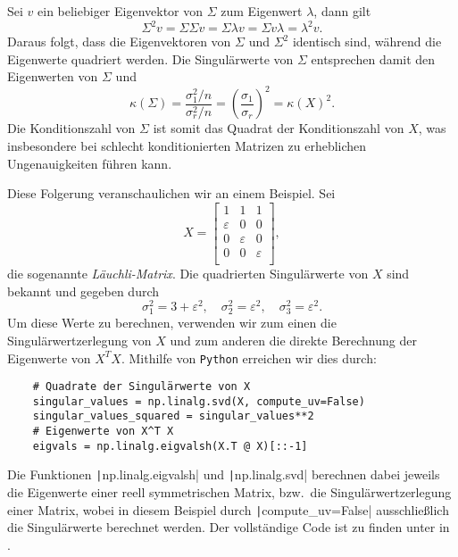 Sei \(v\) ein beliebiger Eigenvektor von \(\Sigma\) zum Eigenwert \(\lambda\), dann gilt
\begin{equation*}
    \Sigma^{2}v = \Sigma \Sigma v = \Sigma \lambda v = \Sigma v \lambda = \lambda^{2} v.
\end{equation*}   
Daraus folgt, dass die Eigenvektoren von \(\Sigma\) und \(\Sigma^{2}\) identisch sind, während die Eigenwerte quadriert werden.
Die Singulärwerte von \(\Sigma\) entsprechen damit den Eigenwerten von \(\Sigma\) und
\begin{equation*}
    \kappa(\Sigma) = \frac{\sigma_{1}^{2}/n}{\sigma_{r}^{2}/n}={\left(\frac{\sigma_{1}}{\sigma_{r}}\right)}^{2} = {\kappa(X)}^{2}.
\end{equation*}  
Die Konditionszahl von \(\Sigma\) ist somit das Quadrat der Konditionszahl von \(X\), was insbesondere bei schlecht konditionierten Matrizen zu erheblichen Ungenauigkeiten führen kann.

Diese Folgerung veranschaulichen wir an einem Beispiel.
Sei 
\begin{equation*}
    X = 
    \begin{bmatrix}
        1 & 1 & 1 \\
        \varepsilon & 0 & 0 \\
        0 & \varepsilon & 0 \\
        0 & 0 & \varepsilon \\
    \end{bmatrix},
\end{equation*}
die sogenannte \emph{Läuchli-Matrix}.
Die quadrierten Singulärwerte von \(X\) sind bekannt und gegeben durch  
\begin{equation*}
    \sigma_{1}^{2} = 3 + \varepsilon^{2}, \quad \sigma_{2}^{2} = \varepsilon^{2}, \quad \sigma_{3}^{2} = \varepsilon^{2}.
\end{equation*} 
Um diese Werte zu berechnen, verwenden wir zum einen die Singulärwertzerlegung von \(X\) und zum anderen die direkte Berechnung der Eigenwerte von \(X^{T}X\).   
Mithilfe von \texttt{Python} erreichen wir dies durch:
\begin{verbatim}
    # Quadrate der Singulärwerte von X
    singular_values = np.linalg.svd(X, compute_uv=False)
    singular_values_squared = singular_values**2   
    # Eigenwerte von X^T X
    eigvals = np.linalg.eigvalsh(X.T @ X)[::-1]
\end{verbatim}
Die Funktionen \texttt|np.linalg.eigvalsh| und \texttt|np.linalg.svd| berechnen dabei jeweils die Eigenwerte einer reell symmetrischen Matrix, bzw.\ die Singulärwertzerlegung einer Matrix, wobei in diesem Beispiel durch \texttt|compute_uv=False| ausschließlich die Singulärwerte berechnet werden. 
Der vollständige Code ist zu finden unter  in .

